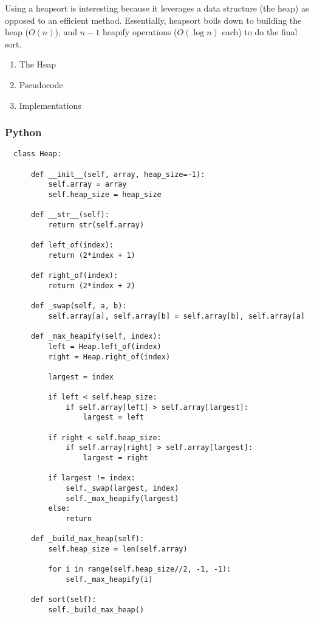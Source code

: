 \documentclass[11pt]{article}
\begin{document}
Using a heapsort is interesting because it leverages a data structure
(the heap) as opposed to an efficient method. Essentially, heapsort
boils down to building the heap (\(O(n)\)), and \(n-1\) heapify
operations (\(O(\log{}n)\) each) to do the final sort.

\begin{enumerate}
\item The Heap
\label{sec:orgcc83b8c}
\item Pseudocode
\label{sec:org8b6ef48}
\item Implementations
\label{implementations}
\end{enumerate}
\subsubsection{Python}
\label{python}
\begin{verbatim}
  class Heap:

      def __init__(self, array, heap_size=-1):
          self.array = array
          self.heap_size = heap_size

      def __str__(self):
          return str(self.array)

      def left_of(index):
          return (2*index + 1)

      def right_of(index):
          return (2*index + 2)

      def _swap(self, a, b):
          self.array[a], self.array[b] = self.array[b], self.array[a]

      def _max_heapify(self, index):
          left = Heap.left_of(index)
          right = Heap.right_of(index)

          largest = index

          if left < self.heap_size:
              if self.array[left] > self.array[largest]:
                  largest = left

          if right < self.heap_size:
              if self.array[right] > self.array[largest]:
                  largest = right

          if largest != index:
              self._swap(largest, index)
              self._max_heapify(largest)
          else:
              return

      def _build_max_heap(self):
          self.heap_size = len(self.array)

          for i in range(self.heap_size//2, -1, -1):
              self._max_heapify(i)

      def sort(self):
          self._build_max_heap()


\end{verbatim}
\end{document}

